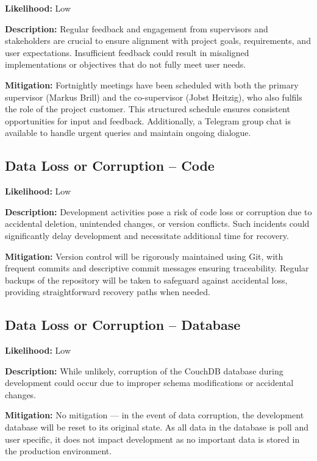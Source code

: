 \textbf{Likelihood:} Low

\textbf{Description:} Regular feedback and engagement from supervisors and stakeholders are crucial to ensure alignment with project goals, requirements, and user expectations. Insufficient feedback could result in misaligned implementations or objectives that do not fully meet user needs.

\textbf{Mitigation:} Fortnightly meetings have been scheduled with both the primary supervisor (Markus Brill) and the co-supervisor (Jobst Heitzig), who also fulfils the role of the project customer. This structured schedule ensures consistent opportunities for input and feedback. Additionally, a Telegram group chat is available to handle urgent queries and maintain ongoing dialogue.

\subsection*{Data Loss or Corruption -- Code}

\textbf{Likelihood:} Low

\textbf{Description:} Development activities pose a risk of code loss or corruption due to accidental deletion, unintended changes, or version conflicts. Such incidents could significantly delay development and necessitate additional time for recovery.

\textbf{Mitigation:} Version control will be rigorously maintained using Git, with frequent commits and descriptive commit messages ensuring traceability. Regular backups of the repository will be taken to safeguard against accidental loss, providing straightforward recovery paths when needed.

\subsection*{Data Loss or Corruption -- Database}

\textbf{Likelihood:} Low

\textbf{Description:} While unlikely, corruption of the CouchDB database during development could occur due to improper schema modifications or accidental changes.

\textbf{Mitigation:} No mitigation --- in the event of data corruption, the development database will be reset to its original state. As all data in the database is poll and user specific, it does not impact development as no important data is stored in the production environment.

